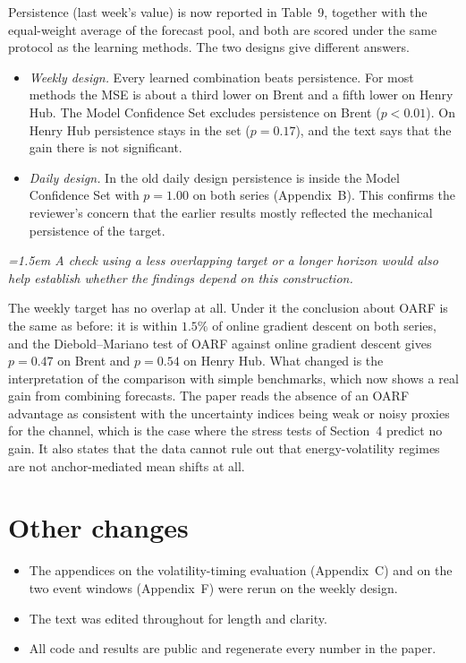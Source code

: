 \documentclass[12pt]{article}
\newenvironment{reviewer}{\par\begingroup\itshape\color{black!70}\leftskip=1.5em}{\par\endgroup}
\begin{document}
Persistence (last week's value) is now reported in Table~9, together with the
equal-weight average of the forecast pool, and both are scored under the same
protocol as the learning methods. The two designs give different answers.
\begin{itemize}
\item \emph{Weekly design.} Every learned combination beats persistence. For most
methods the MSE is about a third lower on Brent and a fifth lower on Henry Hub. The
Model Confidence Set excludes persistence on Brent ($p<0.01$). On Henry Hub
persistence stays in the set ($p=0.17$), and the text says that the gain there is not
significant.
\item \emph{Daily design.} In the old daily design persistence is inside the Model
Confidence Set with $p=1.00$ on both series (Appendix~B). This confirms the
reviewer's concern that the earlier results mostly reflected the mechanical
persistence of the target.
\end{itemize}

\begin{reviewer}
A check using a less overlapping target or a longer horizon would also help
establish whether the findings depend on this construction.
\end{reviewer}

The weekly target has no overlap at all. Under it the conclusion about OARF is the
same as before: it is within $1.5\%$ of online gradient descent on both series, and
the Diebold--Mariano test of OARF against online gradient descent gives $p=0.47$ on
Brent and $p=0.54$ on Henry Hub. What changed is the interpretation of the comparison
with simple benchmarks, which now shows a real gain from combining forecasts. The
paper reads the absence of an OARF advantage as consistent with the uncertainty
indices being weak or noisy proxies for the channel, which is the case where the
stress tests of Section~4 predict no gain. It also states that the data cannot rule
out that energy-volatility regimes are not anchor-mediated mean shifts at all.

\section*{Other changes}
\begin{itemize}
\item The appendices on the volatility-timing evaluation (Appendix~C) and on the two
event windows (Appendix~F) were rerun on the weekly design.
\item The text was edited throughout for length and clarity.
\item All code and results are public and regenerate every number in the paper.
\end{itemize}
\end{document}
